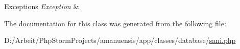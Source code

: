 \begin{DoxyExceptions}{Exceptions}
{\em Exception} & \\
\hline
\end{DoxyExceptions}


The documentation for this class was generated from the following file\+:\begin{DoxyCompactItemize}
\item 
D\+:/\+Arbeit/\+Php\+Storm\+Projects/amanuensis/app/classes/database/\hyperlink{sani_8php}{sani.\+php}\end{DoxyCompactItemize}
